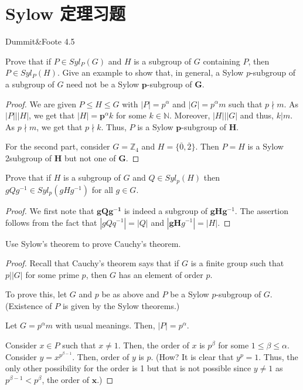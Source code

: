 \section{Sylow 定理习题}

Dummit\&Foote 4.5

\begin{exercise}
Prove that if $P \in S y l_P(G)$ and $H$ is a subgroup of $G$ containing $P$, then $P \in S y l_P(H)$. Give an example to show that, in general, a Sylow $p$-subgroup of a subgroup of $G$ need not be a Sylow $\boldsymbol{p}$-subgroup of $\boldsymbol{G}$.
\end{exercise}

\begin{proof}
We are given $P \leq H \leq G$ with $|P|=p^\alpha$ and $|G|=p^\alpha m$ such that $p \nmid  m$. As $|P|||H|$, we get that $| H \mid=\boldsymbol{p}^\alpha k$ for some $k \in \mathbb{N}$.
Moreover, $|H|||G|$ and thus, $k| m$. As $p \nmid  m$, we get that $p \nmid  k$.
Thus, $P$ is a Sylow $\boldsymbol{p}$-subgroup of $\boldsymbol{H}$.

For the second part, consider $G=\mathbb{Z}_4$ and $H=\{\overline{0}, \overline{2}\}$. Then $P=H$ is a Sylow 2subgroup of $\boldsymbol{H}$ but not one of $\boldsymbol{G}$.
\end{proof}


\begin{exercise}
Prove that if $H$ is a subgroup of $G$ and $Q \in S y l_p(H)$ then $g Q g^{-1} \in S y l_p\left(g H g^{-1}\right)$ for all $g \in G$.
\end{exercise}

\begin{proof}
We first note that $\boldsymbol{g Q g ^ { - 1 }}$ is indeed a subgroup of $\boldsymbol{g H} \boldsymbol{g}^{-1}$.
The assertion follows from the fact that $\left|g Q q^{-1}\right|=|Q|$ and $\left|\boldsymbol{g H} g^{-1}\right|=|H|$.
\end{proof}

\begin{exercise}
Use Sylow's theorem to prove Cauchy's theorem.
\end{exercise}

\begin{proof}
Recall that Cauchy's theorem says that if $G$ is a finite group such that $p||G|$ for some prime $p$, then $G$ has an element of order $p$.

To prove this, let $G$ and $p$ be as above and $P$ be a Sylow $p$-subgroup of $G$. (Existence of $P$ is given by the Sylow theorems.)

Let $G=p^\alpha m$ with usual meanings. Then, $|P|=p^\alpha$.

Consider $x \in P$ such that $x \neq 1$. Then, the order of $x$ is $p^\beta$ for some $1 \leq \beta \leq \alpha$. Consider $y=x^{p^{\beta-1}}$. Then, order of $y$ is $p$. (How? It is clear that $y^p=1$. Thus, the only other possibility for the order is 1 but that is not possible since $y \neq 1$ as $p^{\beta-1}<p^\beta$, the order of $\boldsymbol{x}$.)
\end{proof}

